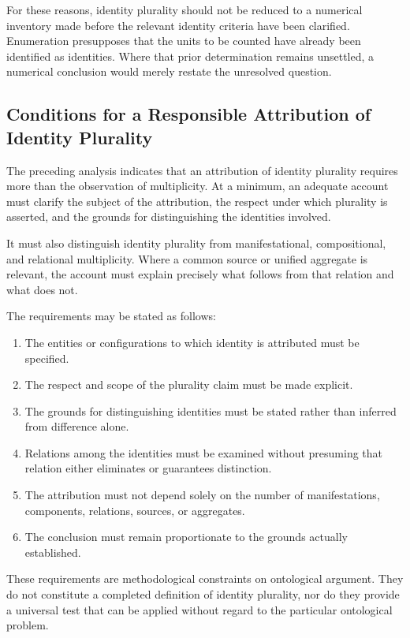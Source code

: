 For these reasons, identity plurality should not be
reduced to a numerical inventory made before the relevant
identity criteria have been clarified. Enumeration
presupposes that the units to be counted have already
been identified as identities. Where that prior
determination remains unsettled, a numerical conclusion
would merely restate the unresolved question.

\subsection{Conditions for a Responsible Attribution of Identity Plurality}

The preceding analysis indicates that an attribution
of identity plurality requires more than the observation
of multiplicity. At a minimum, an adequate account
must clarify the subject of the attribution, the respect
under which plurality is asserted, and the grounds
for distinguishing the identities involved.

It must also distinguish identity plurality from
manifestational, compositional, and relational multiplicity.
Where a common source or unified aggregate is relevant,
the account must explain precisely what follows from
that relation and what does not.

The requirements may be stated as follows:

\begin{enumerate}
    \item The entities or configurations to which identity
    is attributed must be specified.
    \item The respect and scope of the plurality claim
    must be made explicit.
    \item The grounds for distinguishing identities must
    be stated rather than inferred from difference alone.
    \item Relations among the identities must be examined
    without presuming that relation either eliminates
    or guarantees distinction.
    \item The attribution must not depend solely on the
    number of manifestations, components, relations,
    sources, or aggregates.
    \item The conclusion must remain proportionate to
    the grounds actually established.
\end{enumerate}

These requirements are methodological constraints on
ontological argument. They do not constitute a completed
definition of identity plurality, nor do they provide
a universal test that can be applied without regard
to the particular ontological problem.

